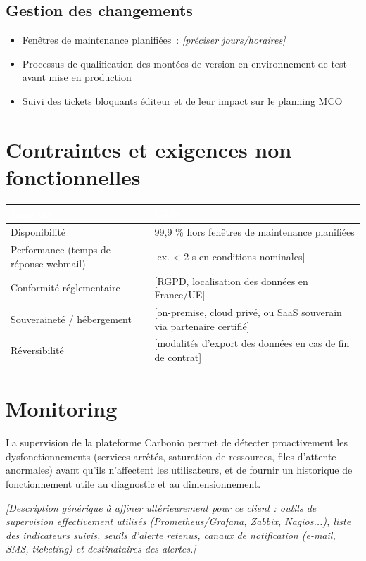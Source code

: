 \documentclass[11pt,a4paper]{report}
\newcommand{\placeholder}[1]{\textit{\textcolor{placeholdercol}{[#1]}}\par\vspace{4pt}}
\newcommand{\tblhead}[1]{\textcolor{white}{\textbf{#1}}}
\begin{document}
\section{Gestion des changements}
\begin{itemize}[nosep]
  \item Fenêtres de maintenance planifiées~: \placeholder{préciser jours/horaires}
  \item Processus de qualification des montées de version en environnement de test avant mise en production
  \item Suivi des tickets bloquants éditeur et de leur impact sur le planning MCO
\end{itemize}

\chapter{Contraintes et exigences non fonctionnelles}
\begin{longtable}{|p{6cm}|p{6.5cm}|}
\hline
\rowcolor{primary}\tblhead{Exigence} & \tblhead{Cible} \\
\hline
\endhead
Disponibilité & 99,9 \% hors fenêtres de maintenance planifiées \\
\hline
Performance (temps de réponse webmail) & [ex. < 2 s en conditions nominales] \\
\hline
Conformité réglementaire & [RGPD, localisation des données en France/UE] \\
\hline
Souveraineté / hébergement & [on-premise, cloud privé, ou SaaS souverain via partenaire certifié] \\
\hline
Réversibilité & [modalités d'export des données en cas de fin de contrat] \\
\hline
\end{longtable}

\chapter{Monitoring}
La supervision de la plateforme Carbonio permet de détecter proactivement les dysfonctionnements (services arrêtés, saturation de ressources, files d'attente anormales) avant qu'ils n'affectent les utilisateurs, et de fournir un historique de fonctionnement utile au diagnostic et au dimensionnement.

\placeholder{Description générique à affiner ultérieurement pour ce client : outils de supervision effectivement utilisés (Prometheus/Grafana, Zabbix, Nagios...), liste des indicateurs suivis, seuils d'alerte retenus, canaux de notification (e-mail, SMS, ticketing) et destinataires des alertes.}
\end{document}
